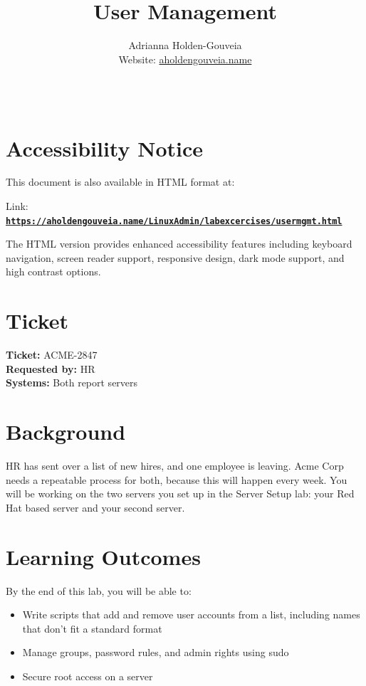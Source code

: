 \documentclass[12pt]{article}
\title{User Management}
\author{
        Adrianna Holden-Gouveia \\
        Website: \href{https://aholdengouveia.name}{aholdengouveia.name}\\ 
        \date{\vspace{-5ex}}
        \faGithub {: aholdengouveia} \\
        }
\begin{document}
    

\maketitle



\section*{Accessibility Notice}
This document is also available in HTML format at:

Link: \href{https://aholdengouveia.name/LinuxAdmin/labexcercises/usermgmt.html}{\textbf{\nolinkurl{https://aholdengouveia.name/LinuxAdmin/labexcercises/usermgmt.html}}}

The HTML version provides enhanced accessibility features including keyboard navigation, screen reader support, responsive design, dark mode support, and high contrast options.


\section*{Ticket}
\noindent\textbf{Ticket:} ACME-2847\\
\textbf{Requested by:} HR\\
\textbf{Systems:} Both report servers

\section*{Background}
HR has sent over a list of new hires, and one employee is leaving. Acme Corp needs a repeatable process for both, because this will happen every week. You will be working on the two servers you set up in the Server Setup lab: your Red Hat based server and your second server.

\section*{Learning Outcomes}
By the end of this lab, you will be able to:
\begin{itemize}
    \item Write scripts that add and remove user accounts from a list, including names that don't fit a standard format
    \item Manage groups, password rules, and admin rights using sudo
    \item Secure root access on a server
\end{itemize}
\end{document}
